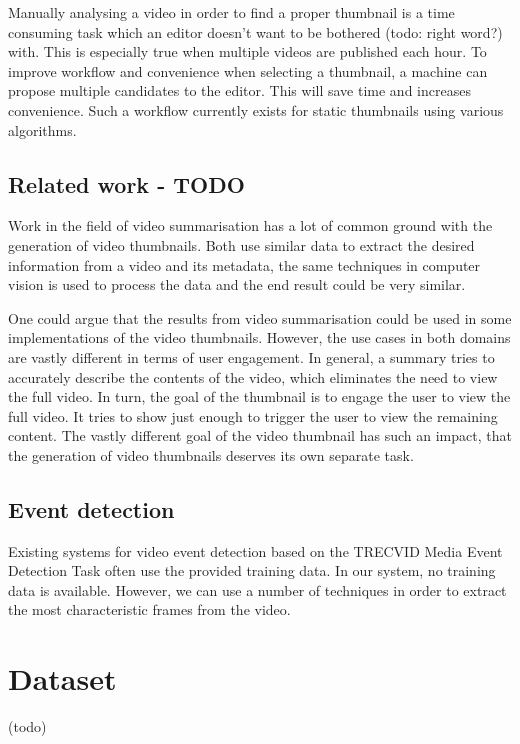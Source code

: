 \documentclass{../resources/acm_proc_article-sp}
\begin{document}

Manually analysing a video in order to find a proper thumbnail is a time consuming task which an editor doesn't want to be bothered (todo: right word?) with. This is especially true when multiple videos are published each hour. To improve workflow and convenience when selecting a thumbnail, a machine can propose multiple candidates to the editor. This will save time and increases convenience. Such a workflow currently exists for static thumbnails using various algorithms.


\subsection{Related work - TODO}

Work in the field of video summarisation has a lot of common ground with the generation of video thumbnails. Both use similar data to extract the desired information from a video and its metadata, the same techniques in computer vision is used to process the data and the end result could be very similar. 

One could argue that the results from video summarisation could be used in some implementations of the video thumbnails. However, the use cases in both domains are vastly different in terms of user engagement. In general, a summary tries to accurately describe the contents of the video, which eliminates the need to view the full video. In turn, the goal of the thumbnail is to engage the user to view the full video. It tries to show just enough to trigger the user to view the remaining content. The vastly different goal of the video thumbnail has such an impact, that the generation of video thumbnails deserves its own separate task.


\subsection{Event detection}

Existing systems for video event detection based on the TRECVID Media Event Detection Task often use the provided training data. In our system, no training data is available. However, we can use a number of techniques in order to extract the most characteristic frames from the video.

\section{Dataset}
(todo)
\end{document}
